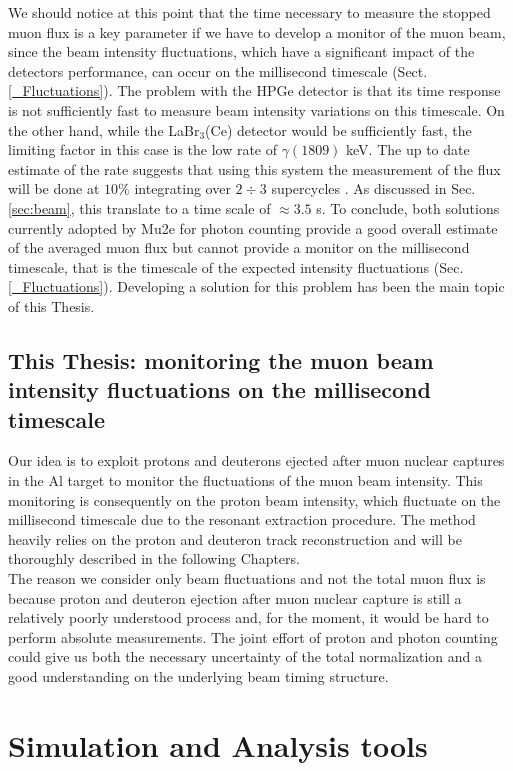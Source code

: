 \documentclass[12pt,a4paper,openright, oneside, titlepage]{book} %
\begin{document}
\noindent
We should notice at this point that the time necessary to measure the stopped muon flux is a key parameter if we have to develop a monitor of the muon beam, since the beam intensity fluctuations, which have a significant impact
of the detectors performance, can occur on the millisecond timescale (Sect. \ref{_Fluctuations}).
The problem with the HPGe detector is that its time response is not
sufficiently fast to measure beam intensity variations on this timescale. 
On the other hand, 
while the LaBr$_3$(Ce) detector would be sufficiently fast, the limiting factor in this case is the low rate of $\gamma(1809)$ keV.
The up to date estimate of the rate suggests that using this system the measurement of the flux will be done at $10\%$ integrating over $2\div3$ supercycles \cite{LaBr3:2019}.
As discussed in Sec. \ref{sec:beam}, this translate to a time scale of $\approx 3.5$ s.
To conclude, both solutions currently adopted by Mu2e for photon counting provide a good overall estimate of the averaged muon flux but cannot provide a monitor on the millisecond timescale, that is the timescale of the expected intensity fluctuations (Sec. \ref{_Fluctuations}).
Developing a solution for this problem has been the main topic of this Thesis.

\subsection{This Thesis: monitoring the muon beam intensity fluctuations on the millisecond timescale}
Our idea is to exploit protons and deuterons ejected after muon nuclear captures in the Al target to monitor the fluctuations of the muon beam intensity. 
This monitoring is consequently on the proton beam intensity, which fluctuate on the millisecond timescale due to the resonant extraction procedure.
The method heavily relies on the proton and deuteron track reconstruction and will be thoroughly described in the following Chapters.\\ 
The reason we consider only beam fluctuations and not the total muon flux is because proton and deuteron ejection after muon nuclear capture is still a relatively poorly understood process and, for the moment, it would be hard to perform absolute measurements.
The joint effort of proton and photon counting could give us both the necessary uncertainty of the total normalization and a good understanding on the underlying beam timing structure.

\section{Simulation and Analysis tools}
\end{document}
